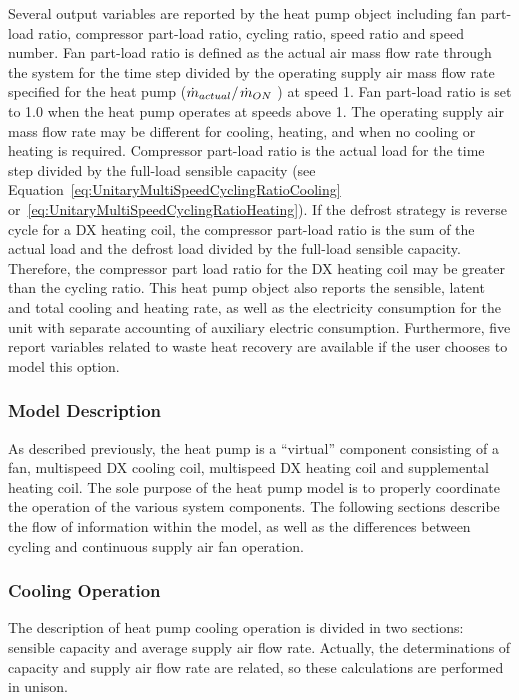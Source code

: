 Several output variables are reported by the heat pump object including fan part-load ratio, compressor part-load ratio, cycling ratio, speed ratio and speed number. Fan part-load ratio is defined as the actual air mass flow rate through the system for the time step divided by the operating supply air mass flow rate specified for the heat pump (\({{{{\dot m}_{actual}}} \mathord{\left/ {\vphantom {{{{\dot m}_{actual}}} {{{\dot m}_{design}}}}} \right. } {{{\dot m}_{ON}}}}\) ) at speed 1. Fan part-load ratio is set to 1.0 when the heat pump operates at speeds above 1. The operating supply air mass flow rate may be different for cooling, heating, and when no cooling or heating is required. Compressor part-load ratio is the actual load for the time step divided by the full-load sensible capacity (see Equation~\ref{eq:UnitaryMultiSpeedCyclingRatioCooling} or~\ref{eq:UnitaryMultiSpeedCyclingRatioHeating}). If the defrost strategy is reverse cycle for a DX heating coil, the compressor part-load ratio is the sum of the actual load and the defrost load divided by the full-load sensible capacity. Therefore, the compressor part load ratio for the DX heating coil may be greater than the cycling ratio. This heat pump object also reports the sensible, latent and total cooling and heating rate, as well as the electricity consumption for the unit with separate accounting of auxiliary electric consumption. Furthermore, five report variables related to waste heat recovery are available if the user chooses to model this option.

\subsubsection{Model Description}\label{model-description-4}

As described previously, the heat pump is a ``virtual'' component consisting of a fan, multispeed DX cooling coil, multispeed DX heating coil and supplemental heating coil. The sole purpose of the heat pump model is to properly coordinate the operation of the various system components. The following sections describe the flow of information within the model, as well as the differences between cycling and continuous supply air fan operation.

\subsubsection{Cooling Operation}\label{cooling-operation-2}

The description of heat pump cooling operation is divided in two sections: sensible capacity and average supply air flow rate. Actually, the determinations of capacity and supply air flow rate are related, so these calculations are performed in unison.

